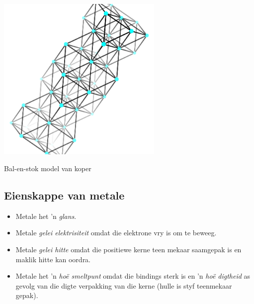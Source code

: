 \begin{minipage}{.5\textwidth}
 \begin{center}
  \includegraphics[width=0.6\textwidth]{photos/copper_structure.png}\\
\begin{caption}{Bal-en-stok model van koper}\end{caption}
 \end{center}

\end{minipage}
\subsection*{Eienskappe van metale}
\begin{itemize}
 \item Metale het  'n \textsl{glans}.
\item Metale \textsl{gelei elektrisiteit} omdat die elektrone vry is om te beweeg.
\item Metale \textsl{gelei hitte} omdat die positiewe kerne teen mekaar saamgepak is en maklik hitte kan oordra.
\item Metale het 'n \textsl{ho\"{e} smeltpunt} omdat die bindings sterk is en 'n \textsl{ho\"{e} digtheid} as gevolg van die digte verpakking van die kerne (hulle is styf teenmekaar gepak).
\end{itemize}

